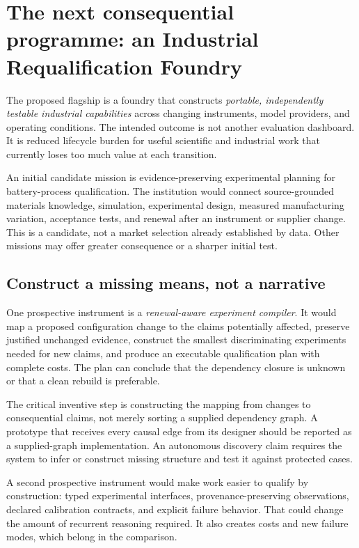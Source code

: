 \section{The next consequential programme: an Industrial Requalification Foundry}
\label{sec:programme}
The proposed flagship is a foundry that constructs \emph{portable, independently testable industrial capabilities} across changing instruments, model providers, and operating conditions. The intended outcome is not another evaluation dashboard. It is reduced lifecycle burden for useful scientific and industrial work that currently loses too much value at each transition.

An initial candidate mission is evidence-preserving experimental planning for battery-process qualification. The institution would connect source-grounded materials knowledge, simulation, experimental design, measured manufacturing variation, acceptance tests, and renewal after an instrument or supplier change. This is a candidate, not a market selection already established by data. Other missions may offer greater consequence or a sharper initial test.

\subsection{Construct a missing means, not a narrative}
One prospective instrument is a \emph{renewal-aware experiment compiler}. It would map a proposed configuration change to the claims potentially affected, preserve justified unchanged evidence, construct the smallest discriminating experiments needed for new claims, and produce an executable qualification plan with complete costs. The plan can conclude that the dependency closure is unknown or that a clean rebuild is preferable.

The critical inventive step is constructing the mapping from changes to consequential claims, not merely sorting a supplied dependency graph. A prototype that receives every causal edge from its designer should be reported as a supplied-graph implementation. An autonomous discovery claim requires the system to infer or construct missing structure and test it against protected cases.

A second prospective instrument would make work easier to qualify by construction: typed experimental interfaces, provenance-preserving observations, declared calibration contracts, and explicit failure behavior. That could change the amount of recurrent reasoning required. It also creates costs and new failure modes, which belong in the comparison.

